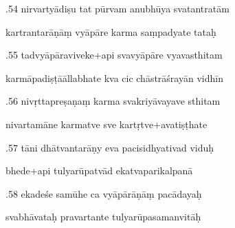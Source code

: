 \documentclass[article,12pt,a4paper]{memoir}%
\newcounter{parCount}
\begin{document}
	  
	  \pstart {}.54 nirvartyādiṣu tat pūrvam anubhūya svatantratām 
	{}
	\pend%
      

	  
	  \pstart \leavevmode%
	kartrantarāṇāṃ vyāpāre karma saṃpadyate tataḥ 
	{}
	\pend%
      

	  
	  \pstart {}.55 tadvyāpāraviveke+api svavyāpāre vyavasthitam 
	{}
	\pend%
      

	  
	  \pstart \leavevmode%
	karmāpadiṣṭāāllabhate kva cic chāstrāśrayān vidhīn 
	{}
	\pend%
      

	  
	  \pstart {}.56 nivṛttapreṣaṇaṃ karma svakriyāvayave sthitam 
	{}
	\pend%
      

	  
	  \pstart \leavevmode%
	nivartamāne karmatve sve kartṛtve+avatiṣṭhate 
	{}
	\pend%
      

	  
	  \pstart {}.57 tāni dhātvantarāṇy eva pacisidhyativad viduḥ 
	{}
	\pend%
      

	  
	  \pstart \leavevmode%
	bhede+api tulyarūpatvād ekatvaparikalpanā 
	{}
	\pend%
      

	  
	  \pstart {}.58 ekadeśe samūhe ca vyāpārāṇāṃ pacādayaḥ 
	{}
	\pend%
      

	  
	  \pstart \leavevmode%
	svabhāvataḥ pravartante tulyarūpasamanvitāḥ 
	{}
	\pend%
      
\end{document}
